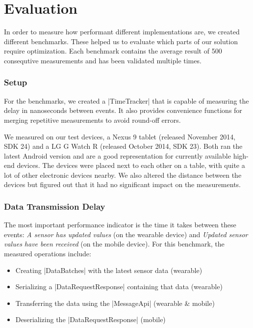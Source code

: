 \section{Evaluation}
\label{sec:evaluation}

In order to measure how performant different implementations are, we created different benchmarks.
These helped us to evaluate which parts of our solution require optimization.
Each benchmark contains the average result of 500 consequtive measurements and has been validated multiple times.

\subsubsection{Setup}
For the benchmarks, we created a |TimeTracker|\cite{sensordatalogger:timetracker} that is capable of measuring the delay in nanoseconds between events. It also provides convenience functions for merging repetitive measurements to avoid round-off errors.

We measured on our test devices, a Nexus 9 tablet (released November 2014, SDK 24) and a LG G Watch R (released October 2014, SDK 23). Both ran the latest Android version and are a good representation for currently available high-end devices.
The devices were placed next to each other on a table, with quite a lot of other electronic devices nearby.
We also altered the distance between the devices but figured out that it had no significant impact on the measurements.

\subsubsection{Data Transmission Delay}
The most important performance indicator is the time it takes between these events: \textit{A sensor has updated values} (on the wearable device) and \textit{Updated sensor values have been received} (on the mobile device). For this benchmark, the measured operations include:

\begin{itemize}[noitemsep]
	\item Creating |DataBatches|\cite{sensordatalogger:databatch} with the latest sensor data (wearable)
	\item Serializing a |DataRequestResponse|\cite{sensordatalogger:datarequestresponse} containing that data (wearable)
	\item Transferring the data using the |MessageApi|\cite{androiddocs:messageapi} (wearable \& mobile)
	\item Deserializing the |DataRequestResponse| (mobile)
\end{itemize}

